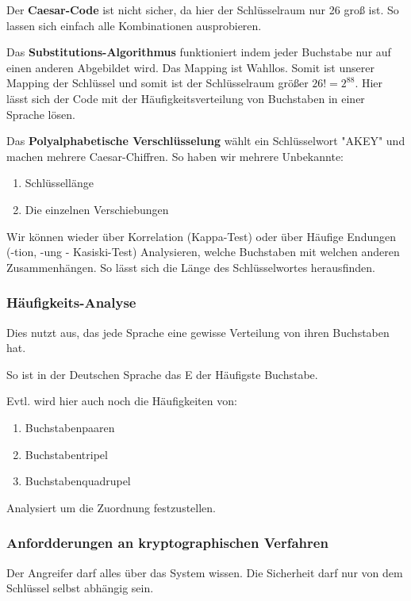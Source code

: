 \documentclass[a4paper]{article}
\begin{document}
Der \textbf{Caesar-Code} ist nicht sicher, da hier der Schlüsselraum nur 26 groß ist. So lassen sich einfach alle Kombinationen ausprobieren.

Das \textbf{Substitutions-Algorithmus} funktioniert indem jeder Buchstabe nur auf einen anderen Abgebildet wird. Das Mapping ist Wahllos. Somit ist unserer Mapping der Schlüssel und somit ist der Schlüsselraum größer $26! = 2^{88}$. Hier lässt sich der Code mit der Häufigkeitsverteilung von Buchstaben in einer Sprache lösen.

Das \textbf{Polyalphabetische Verschlüsselung} wählt ein Schlüsselwort "AKEY" und machen mehrere Caesar-Chiffren. So haben wir mehrere Unbekannte:

\begin{enumerate}
    \item Schlüssellänge
    \item Die einzelnen Verschiebungen
\end{enumerate}

Wir können wieder über Korrelation (Kappa-Test) oder über Häufige Endungen (-tion, -ung - Kasiski-Test) Analysieren, welche Buchstaben mit welchen anderen Zusammenhängen. So lässt sich die Länge des Schlüsselwortes herausfinden.

\subsubsection{Häufigkeits-Analyse}

Dies nutzt aus, das jede Sprache eine gewisse Verteilung von ihren Buchstaben hat.

So ist in der Deutschen Sprache das E der Häufigste Buchstabe.

Evtl. wird hier auch noch die Häufigkeiten von:

\begin{enumerate}
    \item Buchstabenpaaren
    \item Buchstabentripel
    \item Buchstabenquadrupel
\end{enumerate}

Analysiert um die Zuordnung festzustellen.

\subsubsection{Anfordderungen an kryptographischen Verfahren}

Der Angreifer darf alles über das System wissen. Die Sicherheit darf nur von dem Schlüssel selbst abhängig sein.
\end{document}

